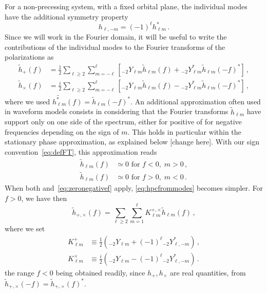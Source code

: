 \documentclass[aps,showpacs,twocolumn,
prd,superscriptaddress,nofootinbib]{revtex4-1}
\newcommand{\be}{\begin{equation}}
\newcommand{\ee}{\end{equation}}
\newcommand{\nn}{\nonumber}
\newcommand{\SM}[1]{{\color{Red} #1}}
\begin{document}
For a non-precessing system, with a fixed orbital plane, the individual modes have the additional symmetry property
\be\label{eq:symmetryhlminusm}
	h_{\ell, -m} = (-1)^{\ell} h_{\ell m}^{*} \,.
\ee
Since we will work in the Fourier domain, it will be useful to write the contributions of the individual modes to the Fourier transforms of the polarizations as
\begin{subequations}\label{eq:hpcfrommodes}
\begin{align}
	\tilde{h}_{+}(f) &= \frac{1}{2} \sum\limits_{\ell \geq 2} \sum\limits_{m=-\ell}^{\ell} \left[ {}_{-2}Y_{\ell m} \tilde{h}_{\ell m}(f) + {}_{-2}Y_{\ell m}^{*} \tilde{h}_{\ell m}(-f)^{*} \right] \,, \\
	\tilde{h}_{\times}(f) &= \frac{i}{2} \sum\limits_{\ell \geq 2} \sum\limits_{m=-\ell}^{\ell} \left[ {}_{-2}Y_{\ell m} \tilde{h}_{\ell m}(f) - {}_{-2}Y_{\ell m}^{*} \tilde{h}_{\ell m}(-f)^{*} \right] \,,
\end{align}
\end{subequations}
where we used $\widetilde{h_{\ell m}^{*}}(f) = \tilde{h}_{\ell m}(-f)^{*}$. An additional approximation often used in waveform models consists in considering that the Fourier transforms $\tilde{h}_{\ell m}$ have support only on one side of the spectrum, either for positive of for negative frequencies depending on the sign of $m$. This holds in particular within the stationary phase approximation, as explained below \SM{[change here]}. With our sign convention~\eqref{eq:defFT}, this approximation reads
\begin{align}\label{eq:zeronegativef}
	\tilde{h}_{\ell m} (f) &\simeq 0 \text{ for } f<0, \; m>0 \nn\,,\\
	\tilde{h}_{\ell m} (f) &\simeq 0 \text{ for } f>0, \; m<0 \,.
\end{align}
When both and~\eqref{eq:zeronegativef} apply, \eqref{eq:hpcfrommodes} becomes simpler. For $f>0$, we have then
\be
	\tilde{h}_{+,\times} (f) = \sum_{\ell \geq 2} \sum_{m = 1}^{\ell} K^{+,\times}_{\ell m} \tilde{h}_{\ell m}(f) \,,
\ee
where we set
\begin{align}
	K^{+}_{\ell m} &\equiv \frac{1}{2} \left( {}_{-2}Y_{\ell m} + (-1)^{\ell} {}_{-2}Y_{\ell, -m}^{*} \right) \,, \nn\\
	K^{\times}_{\ell m} &\equiv \frac{i}{2} \left( {}_{-2}Y_{\ell m} - (-1)^{\ell} {}_{-2}Y_{\ell, -m}^{*} \right) \,.
\end{align}
the range $f<0$ being obtained readily, since $h_{+},h_{\times}$ are real quantities, from $\tilde{h}_{+,\times} (-f) = \tilde{h}_{+,\times}(f)^{*}$.
\end{document}
